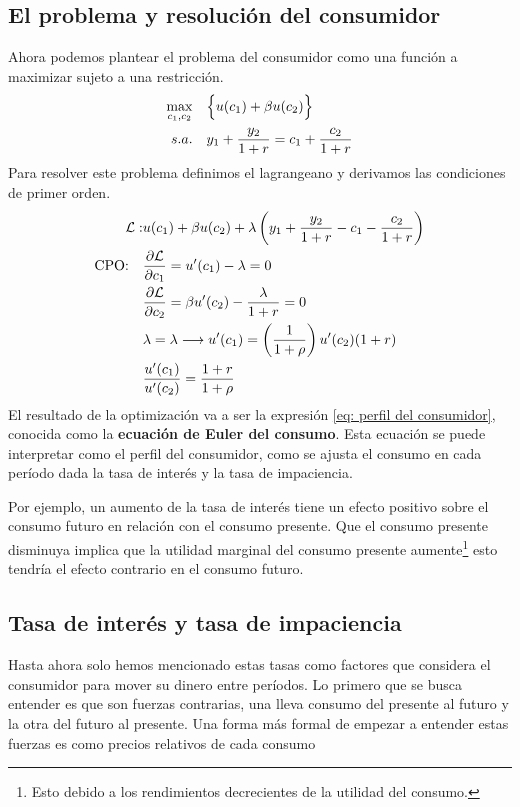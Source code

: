 \subsection{El problema y resolución del consumidor}
Ahora podemos plantear el problema del consumidor como una función a maximizar sujeto a una restricción.
\begin{align*}
        \max_{c_1,c_2} & \quad \Bigl\{ u(c_1) + \beta u(c_2) \Bigr\} \\ s.a.& \quad  y_1 + \frac{y_2}{1+r} = c_1 + \frac{c_2}{1+r}
\end{align*}
Para resolver este problema definimos el lagrangeano y derivamos las condiciones de primer orden. 
\begin{align}
        \mathcal{L}:& u(c_1) + \beta u(c_2) + \lambda \left( y_1 + \frac{y_2}{1+r} - c_1 - \frac{c_2}{1+r} \right) \notag \\
        \text{CPO:} \quad & \frac{\partial \mathcal{L}}{\partial c_1} = u'(c_1) - \lambda = 0 \notag \\
        &\frac{\partial \mathcal{L}}{\partial c_2} = \beta u'(c_2) - \frac{\lambda}{1+r} = 0 \notag \\
        & \lambda = \lambda \longrightarrow u'(c_1) = \left( \frac{1}{1+\rho} \right) u'(c_2)(1+r) \notag \\
        &  \frac{u'(c_1)}{u'(c_2)} = \frac{1+r}{1+\rho} \label{eq: perfil del consumidor}
    \end{align}
El resultado de la optimización va a ser la expresión \ref{eq: perfil del consumidor}, conocida como la \textbf{ecuación de Euler del consumo}. Esta ecuación se puede interpretar como el perfil del consumidor, como se ajusta el consumo en cada período dada la tasa de interés y la tasa de impaciencia. 

Por ejemplo, un aumento de la tasa de interés tiene un efecto positivo sobre el consumo futuro en relación con el consumo presente. Que el consumo presente disminuya implica que la utilidad marginal del consumo presente aumente\footnote{Esto debido a los rendimientos decrecientes de la utilidad del consumo.} esto tendría el efecto contrario en el consumo futuro. 

\subsection{Tasa de interés y tasa de impaciencia}

Hasta ahora solo hemos mencionado estas tasas como factores que considera el consumidor para mover su dinero entre períodos. Lo primero que se busca entender es que son fuerzas contrarias, una lleva consumo del presente al futuro y la otra del futuro al presente. Una forma más formal de empezar a entender estas fuerzas es como precios relativos de cada consumo


